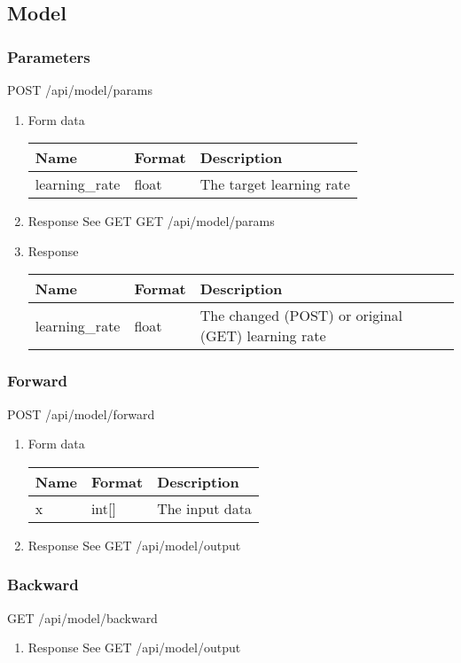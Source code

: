 \documentclass[11pt]{article}
\begin{document}
\subsection{Model}
\label{sec:org92f6d09}
\subsubsection{Parameters}
\label{sec:orgda8113a}
POST /api/model/params
\begin{enumerate}
\item Form data
\label{sec:orgb9ff69c}
\begin{center}
\begin{tabular}{lll}
Name & Format & Description\\
\hline
learning\_rate & float & The target learning rate\\
\end{tabular}
\end{center}
\item Response
\label{sec:orgeb7ee58}
 See GET
GET /api/model/params
\item Response
\label{sec:org423af3d}
\begin{center}
\begin{tabular}{lll}
Name & Format & Description\\
\hline
learning\_rate & float & The changed (POST) or original (GET) learning rate\\
\end{tabular}
\end{center}
\end{enumerate}
\subsubsection{Forward}
\label{sec:org18b287f}
POST /api/model/forward
\begin{enumerate}
\item Form data
\label{sec:org2081c90}
\begin{center}
\begin{tabular}{lll}
Name & Format & Description\\
\hline
x & int[] & The input data\\
\end{tabular}
\end{center}
\item Response
\label{sec:orgab97dea}
See GET /api/model/output
\end{enumerate}
\subsubsection{Backward}
\label{sec:orgfec1eb9}
GET /api/model/backward
\begin{enumerate}
\item Response
\label{sec:org2118e74}
See GET /api/model/output
\end{enumerate}
\end{document}
